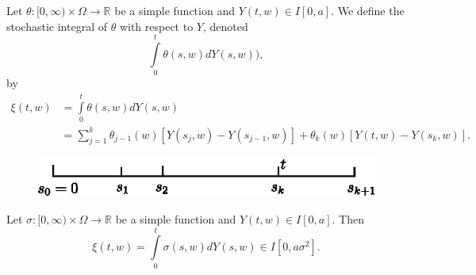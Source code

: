 \begin{defi*}
Let $\theta:[0,\infty)\times \Omega\to \mathbb{R}$ be a simple
  function and $Y(t,w)\in I[0,a]$. We define the stochastic integral
  of $\theta$ with respect to $Y$, denoted
$$
\int\limits^{t}_{0}\theta(s,w)dY(s,w)),
$$
by
\begin{align*}
\xi(t,w) &= \int\limits^{t}_{0}\theta(s,w)dY(s,w)\\
&=
\sum\limits^{k}_{j=1}\theta_{j-1}(w)[Y(s_{j},w)-Y(s_{j-1},w)]+\theta_{k}(w)[Y(t,w)-Y(s_{k},w)]. 
\end{align*}
\begin{figure}[H]
\centering
\includegraphics{figure/fig9.eps}
\end{figure}
\end{defi*}

\setcounter{lemma}{1}
\begin{lemma}\label{chap11-lem2}
Let $\sigma:[0,\infty)\times\Omega\to \mathbb{R}$ be a simple function
  and $Y(t,w)\in I[0,a]$. Then
$$
\xi(t,w)=\int\limits^{t}_{0}\sigma(s,w)dY(s,w)\in I[0,a\sigma^{2}].
$$
\end{lemma}

